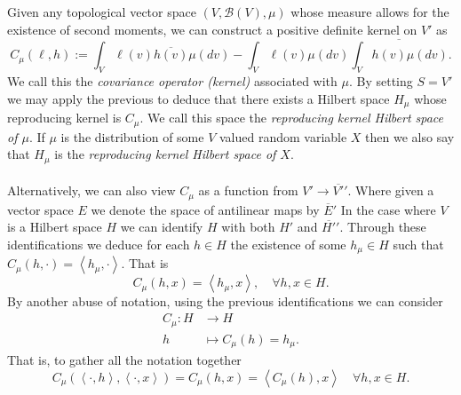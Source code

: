 \documentclass[12pt]{article}
\newcommand{\br}[1]{\left\langle#1\right\rangle}
\newcommand{\Bb}{\mathcal{B}}
\begin{document}
Given any topological vector space $(V,\Bb(V),\mu )$ whose measure allows for the existence of second moments, we can construct a positive definite kernel on $V'$ as
\begin{equation*}
	C_\mu (\ell ,h):=\int_{V}\ell (v) \overline{h(v)}\mu (dv)-\int_{V}\ell (v) \mu (dv)\overline{\int_{V}h(v)\mu (dv)}.
\end{equation*}
We call this the \emph{covariance operator (kernel)} associated with $\mu $. By setting $S=V'$ we may apply the previous to deduce that there exists a Hilbert space $H_\mu $ whose reproducing kernel is $C_\mu $. We call this space the \emph{reproducing kernel Hilbert space of $\mu $}. If $\mu $ is the distribution of some $V$ valued random variable $X$ then we also say that $H_\mu $ is the  \emph{reproducing kernel Hilbert space of $X$}.\\
\\
Alternatively, we can also view  $C_\mu $ as a function from $V'\to \overline{V'}'$. Where given a vector space $E$ we denote the space of antilinear maps by   $\overline{E}'$ In the case where $V$ is a Hilbert space $H$ we can identify $H$ with both $H'$ and $\overline{H'}'$. Through these identifications we deduce for each $h\in H$ the existence of  some $h_\mu \in H$ such that
$C_\mu (h,\cdot )=\br{h_\mu,\cdot  }$. That is
\begin{equation*}
	C_\mu (h,x)=\br{h_\mu,x},\quad\forall h,x \in H .
\end{equation*}
By another abuse of notation, using the previous identifications we can consider
\begin{align*}
	C_\mu : H & \longrightarrow H             \\
	h         & \longmapsto C_\mu (h) = h_\mu
	.\end{align*}
That is, to gather all the notation together
\begin{equation*}
	C_\mu (\br{\cdot ,h},\br{\cdot ,x})=C_\mu (h,x)=\br{C_\mu (h),x}\quad\forall h,x\in H.
\end{equation*}
\end{document}
